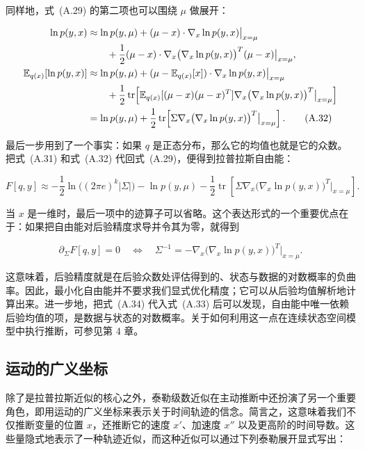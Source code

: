 同样地，式~(A.29) 的第二项也可以围绕 $\mu$ 做展开：

\begin{align}
\ln p(y,x)
&\approx
\ln p(y,\mu)
+ (\mu-x)\cdot \nabla_x \ln p(y,x)\big|_{x=\mu}
\notag \\
&\qquad
+ \frac{1}{2}(\mu-x)\cdot \nabla_x\bigl(\nabla_x \ln p(y,x)\bigr)^T(\mu-x)\big|_{x=\mu},
\notag \\
\mathbb{E}_{q(x)}[\ln p(y,x)]
&\approx
\ln p(y,\mu)
+ (\mu-\mathbb{E}_{q(x)}[x])\cdot \nabla_x \ln p(y,x)\big|_{x=\mu}
\notag \\
&\qquad
+ \frac{1}{2}\operatorname{tr}\!\left[
\mathbb{E}_{q(x)}[(\mu-x)(\mu-x)^T]
\nabla_x\bigl(\nabla_x \ln p(y,x)\bigr)^T\big|_{x=\mu}
\right]
\notag \\
&=
\ln p(y,\mu)
+ \frac{1}{2}\operatorname{tr}\!\left[
\Sigma
\nabla_x\bigl(\nabla_x \ln p(y,x)\bigr)^T\big|_{x=\mu}
\right].
\tag{A.32}
\end{align}

最后一步用到了一个事实：如果 $q$ 是正态分布，那么它的均值也就是它的众数。把式~(A.31) 和式~(A.32) 代回式~(A.29)，便得到拉普拉斯自由能：

\begin{equation}
F[q,y]
\approx
-\frac{1}{2}\ln\!\bigl((2\pi e)^k |\Sigma|\bigr)
- \ln p(y,\mu)
- \frac{1}{2}\operatorname{tr}\!\left[
\Sigma
\nabla_x\bigl(\nabla_x \ln p(y,x)\bigr)^T\big|_{x=\mu}
\right].
\tag{A.33}
\end{equation}

当 $x$ 是一维时，最后一项中的迹算子可以省略。这个表达形式的一个重要优点在于：如果把自由能对后验精度求导并令其为零，就得到

\begin{equation}
\partial_{\Sigma} F[q,y] = 0
\quad\Leftrightarrow\quad
\Sigma^{-1}
=
-\nabla_x\bigl(\nabla_x \ln p(y,x)\bigr)^T\big|_{x=\mu}.
\tag{A.34}
\end{equation}

这意味着，后验精度就是在后验众数处评估得到的、状态与数据的对数概率的负曲率。因此，最小化自由能并不要求我们显式优化精度；它可以从后验均值解析地计算出来。进一步地，把式~(A.34) 代入式~(A.33) 后可以发现，自由能中唯一依赖后验均值的项，是数据与状态的对数概率。关于如何利用这一点在连续状态空间模型中执行推断，可参见第 4 章。

\subsection{运动的广义坐标}

除了是拉普拉斯近似的核心之外，泰勒级数近似在主动推断中还扮演了另一个重要角色，即用运动的广义坐标来表示关于时间轨迹的信念。简言之，这意味着我们不仅推断变量的位置 $x$，还推断它的速度 $x'$、加速度 $x''$ 以及更高阶的时间导数。这些量隐式地表示了一种轨迹近似，而这种近似可以通过下列泰勒展开显式写出：

